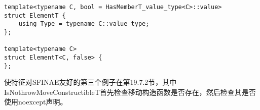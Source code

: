 \begin{lstlisting}[style=styleCXX]
template<typename C, bool = HasMemberT_value_type<C>::value>
struct ElementT {
	using Type = typename C::value_type;
};

template<typename C>
struct ElementT<C, false> {
};
\end{lstlisting}

使特征对SFINAE友好的第三个例子在第19.7.2节，其中IsNothrowMoveConstructibleT首先检查移动构造函数是否存在，然后检查其是否使用noexcept声明。














